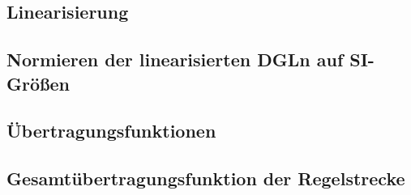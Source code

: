 \documentclass[10pt,a4paper]{article}
\begin{document}
\subsection{Linearisierung}


\subsection{Normieren der linearisierten DGLn auf SI-Größen}


\subsection{Übertragungsfunktionen}


\subsection{Gesamtübertragungsfunktion der Regelstrecke}
\end{document}
